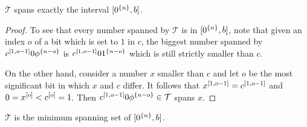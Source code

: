 \begin{theorem}[Feasibility]
\label{theorem:prefixfeasible}
$\mathcal{T}$ spans exactly the interval
$[0^{\{n\}}, b]$.
\end{theorem}

\begin{proof}
To see that every number spanned by $\mathcal{T}$
is in $[0^{\{n\}}, b]$,
note that given an index $o$ of a bit which is set to $1$
in $c$,
the biggest number spanned by
$c^{[1, o-1]} 0 \phi^{\{n-o\}}$ is
$c^{[1, o-1]} 0 1^{\{n-o\}}$
which is still strictly smaller than $c$.

On the other hand,
consider a number $x$ smaller than $c$
and let $o$ be the most significant bit in which $x$ and $c$ differ. It follows that
$x^{[1, o-1]} = c^{[1, o-1]}$
and $0 = x^{[o]} < c^{[o]} = 1$.
Then
$c^{[1, o - 1]} 0 \phi^{\{n - o\}} \in \mathcal{T}$
spans $x$.
\end{proof}

\begin{theorem}[Optimality]
\label{proof:prefixoptimal}
$\mathcal{T}$ is the minimum spanning set of
$[0^{\{n\}}, b]$.
\end{theorem}

